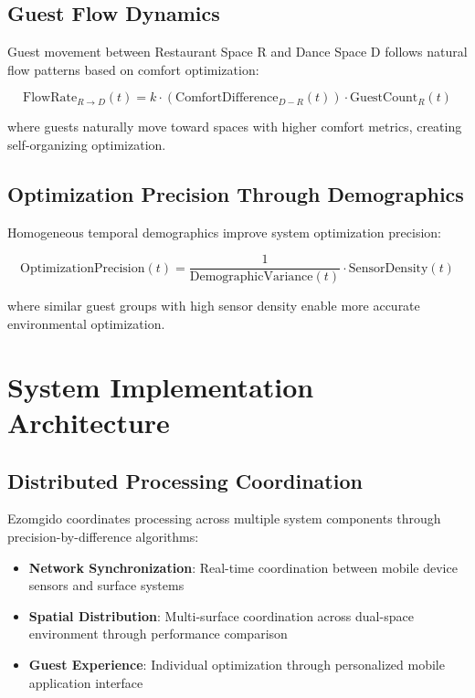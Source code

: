 \documentclass[12pt,a4paper]{article}
\begin{document}
\subsection{Guest Flow Dynamics}

Guest movement between Restaurant Space R and Dance Space D follows natural flow patterns based on comfort optimization:

\begin{equation}
\text{FlowRate}_{R \rightarrow D}(t) = k \cdot (\text{ComfortDifference}_{D-R}(t)) \cdot \text{GuestCount}_R(t)
\end{equation}

where guests naturally move toward spaces with higher comfort metrics, creating self-organizing optimization.

\subsection{Optimization Precision Through Demographics}

Homogeneous temporal demographics improve system optimization precision:

\begin{equation}
\text{OptimizationPrecision}(t) = \frac{1}{\text{DemographicVariance}(t)} \cdot \text{SensorDensity}(t)
\end{equation}

where similar guest groups with high sensor density enable more accurate environmental optimization.

\section{System Implementation Architecture}

\subsection{Distributed Processing Coordination}

Ezomgido coordinates processing across multiple system components through precision-by-difference algorithms:

\begin{itemize}
\item \textbf{Network Synchronization}: Real-time coordination between mobile device sensors and surface systems
\item \textbf{Spatial Distribution}: Multi-surface coordination across dual-space environment through performance comparison
\item \textbf{Guest Experience}: Individual optimization through personalized mobile application interface
\end{itemize}
\end{document}
